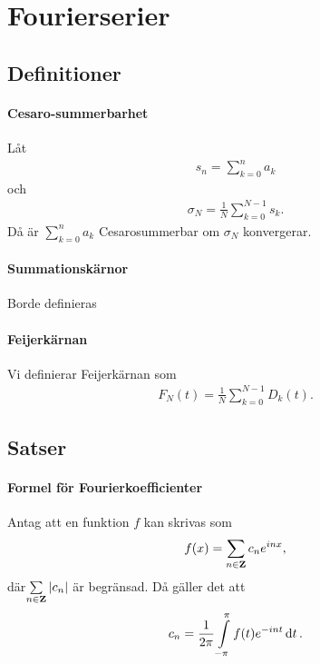 \section{Fourierserier}

\subsection{Definitioner}

\paragraph{Cesaro-summerbarhet}
Låt
\begin{align*}
	s_{n} = \sum\limits_{k = 0}^{n}a_{k}
\end{align*}
och
\begin{align*}
	\sigma_{N} = \frac{1}{N}\sum\limits_{k = 0}^{N - 1}s_{k}.
\end{align*}
Då är $\sum\limits_{k = 0}^{n}a_{k}$ Cesarosummerbar om $\sigma_{N}$ konvergerar.

\paragraph{Summationskärnor}
Borde definieras

\paragraph{Feijerkärnan}
Vi definierar Feijerkärnan som
\begin{align*}
	F_{N}(t) = \frac{1}{N}\sum\limits_{k = 0}^{N - 1}D_{k}(t).
\end{align*}

\subsection{Satser}

\paragraph{Formel för Fourierkoefficienter}
Antag att en funktion $f$ kan skrivas som
\begin{align*}
	f(x) = \sum\limits_{n\in\mathbf{Z}}c_{n}e^{inx},
\end{align*}
där$\sum\limits_{n\in\mathbf{Z}}\abs{c_{n}}$ är begränsad. Då gäller det att
\begin{align*}
	c_{n} = \frac{1}{2\pi}\int\limits_{-\pi}^{\pi}f(t)e^{-int}\dd{t}.
\end{align*}


